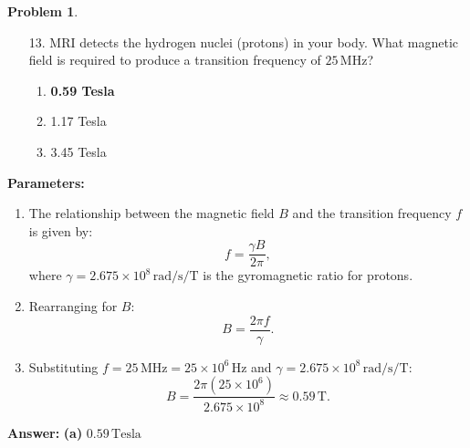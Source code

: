 \documentclass[12pt]{article}
\theoremstyle{definition} %
\newtheorem{problem}{Problem}
\theoremstyle{plain} %
\begin{document}
\begin{problem}
    \begin{enumerate}
        \item[13.] MRI detects the hydrogen nuclei (protons) in your body. What magnetic field is required to produce a transition frequency of \(25 \, \text{MHz}\)?
        \begin{enumerate}
            \item \textbf{0.59 Tesla}
            \item 1.17 Tesla
            \item 3.45 Tesla
        \end{enumerate}
    \end{enumerate}
    
    \textbf{Parameters:}
    \begin{enumerate}
        \item The relationship between the magnetic field \(B\) and the transition frequency \(f\) is given by:
        $$
        f = \frac{\gamma B}{2\pi},
        $$
        where \(\gamma = 2.675 \times 10^8 \, \text{rad/s/T}\) is the gyromagnetic ratio for protons.
        \item Rearranging for \(B\):
        $$
        B = \frac{2\pi f}{\gamma}.
        $$
        \item Substituting \(f = 25 \, \text{MHz} = 25 \times 10^6 \, \text{Hz}\) and \(\gamma = 2.675 \times 10^8 \, \text{rad/s/T}\):
        $$
        B = \frac{2\pi (25 \times 10^6)}{2.675 \times 10^8} \approx 0.59 \, \text{T}.
        $$
    \end{enumerate}
    
    \textbf{Answer:} \textbf{(a)} \(0.59 \, \text{Tesla}\)
    
\end{problem}
\end{document}
